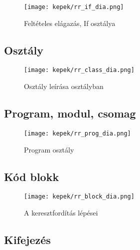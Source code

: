 \begin{figure}
\centering
\texttt{[image: kepek/rr\_if\_dia.png]}
\caption{Feltételes elágazás, If osztálya}
\label{fig:process}
\end{figure}

\subsection{Osztály}

\begin{figure}
\centering
\texttt{[image: kepek/rr\_class\_dia.png]}
\caption{Osztály leírása osztályban}
\label{fig:process}
\end{figure}

\subsection{Program, modul, csomag}

\begin{figure}
\centering
\texttt{[image: kepek/rr\_prog\_dia.png]}
\caption{Program osztály}
\label{fig:process}
\end{figure}

\subsection{Kód blokk}

\begin{figure}
\centering
\texttt{[image: kepek/rr\_block\_dia.png]}
\caption{A keresztfordítás lépései}
\label{fig:process}
\end{figure}

\subsection{Kifejezés}


